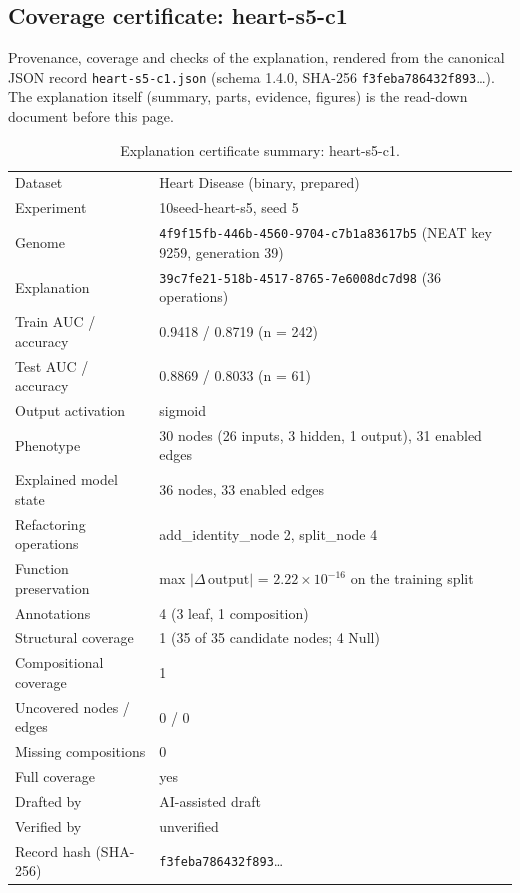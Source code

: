 \providecommand{\explaneatcertdir}[1]{}
\begin{drafted}
\section{Coverage certificate: heart-s5-c1}\label{app:heart-s5-c1:sec}
Provenance, coverage and checks of the explanation, rendered from the canonical JSON record \texttt{heart-s5-c1.json} (schema 1.4.0, SHA-256 \texttt{f3feba786432f893}\ldots). The explanation itself (summary, parts, evidence, figures) is the read-down document before this page.

\begin{table}[htbp]
\centering\small
\begin{tabularx}{\linewidth}{@{}lX@{}}
\toprule
Dataset & Heart Disease (binary, prepared) \\
Experiment & 10seed-heart-s5, seed 5 \\
Genome & \texttt{4f9f15fb-446b-4560-9704-c7b1a83617b5} (NEAT key 9259, generation 39) \\
Explanation & \texttt{39c7fe21-518b-4517-8765-7e6008dc7d98} (36 operations) \\
Train AUC / accuracy & 0.9418 / 0.8719 (n = 242) \\
Test AUC / accuracy & 0.8869 / 0.8033 (n = 61) \\
Output activation & sigmoid \\
Phenotype & 30 nodes (26 inputs, 3 hidden, 1 output), 31 enabled edges \\
Explained model state & 36 nodes, 33 enabled edges \\
Refactoring operations & add\_\allowbreak{}identity\_\allowbreak{}node 2, split\_\allowbreak{}node 4 \\
Function preservation & max $|\Delta\,\mathrm{output}|$ = $2.22\times 10^{-16}$ on the training split \\
Annotations & 4 (3 leaf, 1 composition) \\
Structural coverage & 1 (35 of 35 candidate nodes; 4 Null) \\
Compositional coverage & 1 \\
Uncovered nodes / edges & 0 / 0 \\
Missing compositions & 0 \\
Full coverage & yes \\
Drafted by & AI-assisted draft \\
Verified by & unverified \\
Record hash (SHA-256) & \texttt{f3feba786432f893}\ldots \\
\bottomrule
\end{tabularx}
\caption{Explanation certificate summary: heart-s5-c1.}
\label{app:heart-s5-c1:summary}
\end{table}

\end{drafted}
